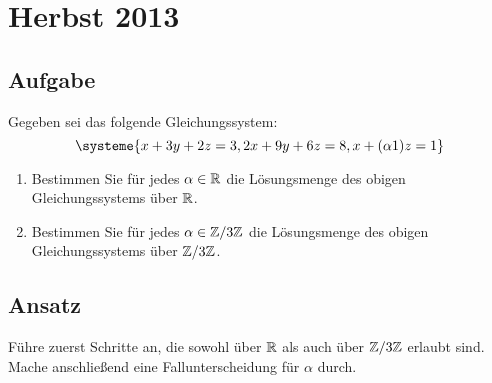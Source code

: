 \newpage


\section{Herbst 2013}

\subsection{Aufgabe}
Gegeben sei das folgende Gleichungssystem:
\begin{equation*}
	\systeme{x+3y+2z=3, 2x+9y+6z=8, x + (\alpha \- 1)z = 1}
\end{equation*}
\begin{enumerate}
	\item Bestimmen Sie für jedes \( \alpha \in \mathbb{R} \) die Lösungsmenge des obigen Gleichungssystems über \( \mathbb{R} \).
	\item Bestimmen Sie für jedes \( \alpha \in \mathbb{Z}/3\mathbb{Z} \) die Lösungsmenge des obigen Gleichungssystems über \( \mathbb{Z}/3\mathbb{Z} \). 
\end{enumerate}

\subsection{Ansatz}
Führe zuerst Schritte an, die sowohl über \( \mathbb{R} \) als auch über \( \mathbb{Z}/3\mathbb{Z} \) erlaubt sind. Mache anschließend eine Fallunterscheidung für \( \alpha \) durch.

